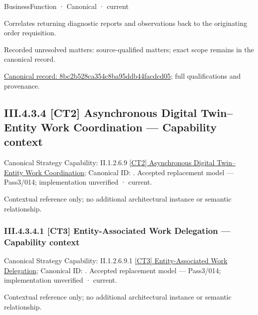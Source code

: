 \label{element:8bc2b528ca354c8ba95ddb44facdcd05}
{\small BusinessFunction · Canonical · current}\par

Correlates returning diagnostic reports and observations back to the originating order requisition.


{\small Recorded unresolved matters: source-qualified matters; exact scope remains in the canonical record.}\par
{\footnotesize \href{../../../../../../../../continuum/business/business-function/8bc2b528ca354c8ba95ddb44facdcd05.md}{Canonical record: 8bc2b528ca354c8ba95ddb44facdcd05}; full qualifications and provenance.}\par
\subsection*{III.4.3.4 [CT2] Asynchronous Digital Twin–Entity Work Coordination — Capability context}
\label{navigation:III.4.3.4}

{\small Canonical Strategy Capability: II.1.2.6.9 \hyperref[element:7a97e45e72cf468983b6ba5c79217503]{[CT2] Asynchronous Digital Twin–Entity Work Coordination}; Canonical ID: \texttt{}. Accepted replacement model — Pass3/014; implementation unverified · current.}\par
Contextual reference only; no additional architectural instance or semantic relationship.\par
\subsubsection*{III.4.3.4.1 [CT3] Entity-Associated Work Delegation — Capability context}
\label{navigation:III.4.3.4.1}

{\small Canonical Strategy Capability: II.1.2.6.9.1 \hyperref[element:54b2f346a08c49a98ed9b3d64b2f877e]{[CT3] Entity-Associated Work Delegation}; Canonical ID: \texttt{}. Accepted replacement model — Pass3/014; implementation unverified · current.}\par
Contextual reference only; no additional architectural instance or semantic relationship.\par

